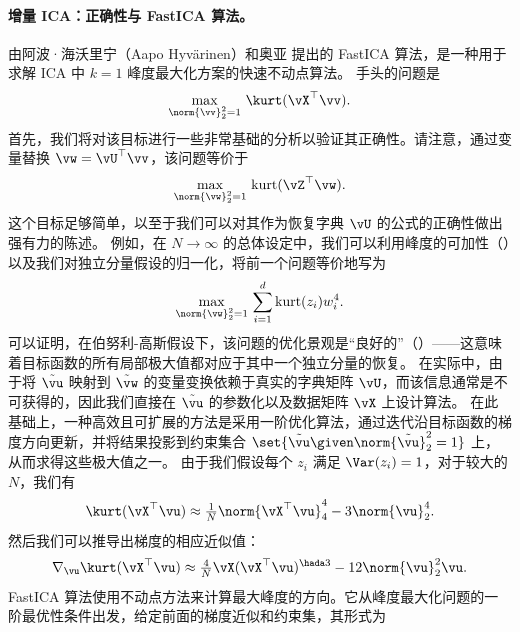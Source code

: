 \documentclass[../../book-main_zh.tex]{subfiles}
\begin{document}
\paragraph{增量 ICA：正确性与 FastICA 算法。}
由阿波·海沃里宁（Aapo Hyv\"{a}rinen）和奥亚 \cite{hyvarinen-1997} 提出的 FastICA 算法，是一种用于求解
ICA 中 $k=1$ 峰度最大化方案的快速不动点算法。
手头的问题是
\begin{equation}\label{eq:kurtosis-maximization-sphere-finitesample}
    \max_{\norm{\vv}_2^2 = 1}\, \kurt(\vX^\top \vv).
\end{equation}
首先，我们将对该目标进行一些非常基础的分析以验证其正确性。请注意，通过变量替换 $\vw =
\vU^\top \vv$，该问题等价于
\begin{equation*}
    \max_{\norm{\vw}_2^2 = 1}\,
    \mathrm{kurt}(\vZ^\top \vw).
\end{equation*}
这个目标足够简单，以至于我们可以对其作为恢复字典 $\vU$ 的公式的正确性做出强有力的陈述。
例如，在 $N \to \infty$
的总体设定中，我们可以利用峰度的可加性（）以及我们对独立分量假设的归一化，将前一个问题等价地写为
\begin{equation}\label{eq:kurtosis-maximization-sphere-population-simple}
    \max_{\norm{\vw}_2^2 = 1}\,
    \sum_{i=1}^d \mathrm{kurt}(z_i) w_i^4.
\end{equation}
可以证明，在伯努利-高斯假设下，该问题的优化景观是“良好的”（）——这意味着目标函数的所有局部极大值都对应于其中一个独立分量的恢复。
在实际中，由于将 $\tilde{\vu}$ 映射到 $\tilde{\vw}$ 的变量变换依赖于真实的字典矩阵 $\vU$，而该信息通常是不可获得的，因此我们直接在 $\tilde{\vu}$ 的参数化以及数据矩阵 $\vX$ 上设计算法。
在此基础上，一种高效且可扩展的方法是采用一阶优化算法，通过迭代沿目标函数的梯度方向更新，并将结果投影到约束集合 $\set{\tilde{\vu} \given \norm{\tilde{\vu}}_2^2 = 1}$ 上，从而求得这些极大值之一。
由于我们假设每个 $z_i$ 满足 $\Var(z_i)=1$，对于较大的 $N$，我们有
\begin{equation}\label{eq:kurtosis-approximation-l4}
    \kurt(\vX^\top \vu)
    \approx
    \tfrac{1}{N} \norm{\vX^\top \vu}_4^4 - 3 \norm{\vu}_2^4.
\end{equation}
然后我们可以推导出梯度的相应近似值：
\begin{equation*}
    \nabla_{\vu} \kurt(\vX^\top \vu)
    \approx
    \tfrac{4}{N} \vX (\vX^\top \vu)^{\hada 3}
    - 12 \norm{\vu}_2^2 \vu.
\end{equation*}
FastICA 算法使用不动点方法来计算最大峰度的方向。它从峰度最大化问题的一阶最优性条件出发，给定前面的梯度近似和约束集，其形式为
\end{document}
